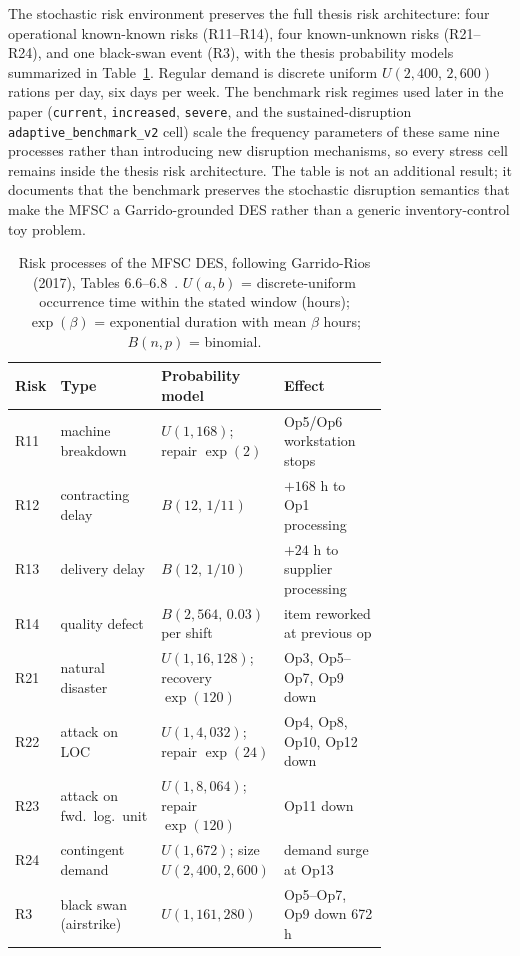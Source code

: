 The stochastic risk environment preserves the full thesis risk
architecture: four operational known-known risks (R11--R14), four
known-unknown risks (R21--R24), and one black-swan event (R3), with the
thesis probability models summarized in
Table~\ref{tab:risk_provenance_examples}. Regular demand is discrete
uniform $U(2{,}400,\,2{,}600)$ rations per day, six days per week. The
benchmark risk regimes used later in the paper (\texttt{current},
\texttt{increased}, \texttt{severe}, and the sustained-disruption
\texttt{adaptive\_benchmark\_v2} cell) scale the frequency parameters
of these same nine processes rather than introducing new disruption
mechanisms, so every stress cell remains inside the thesis risk
architecture. The table is not an additional result; it documents that
the benchmark preserves the stochastic disruption semantics that make
the MFSC a Garrido-grounded DES rather than a generic
inventory-control toy problem.

\begin{table}[htbp]
\centering
\caption{Risk processes of the MFSC DES, following Garrido-Rios (2017),
Tables 6.6--6.8~\cite{garrido2017}. $U(a,b)$ = discrete-uniform
occurrence time within the stated window (hours); $\exp(\beta)$ =
exponential duration with mean $\beta$ hours; $B(n,p)$ = binomial.}
\label{tab:risk_provenance_examples}
\small
\begin{tabular}{l p{0.17\linewidth} p{0.27\linewidth} p{0.30\linewidth}}
\toprule
Risk & Type & Probability model & Effect \\
\midrule
R11 & machine breakdown & $U(1,168)$; repair $\exp(2)$ & Op5/Op6 workstation stops \\
R12 & contracting delay & $B(12,\,1/11)$ & $+168$ h to Op1 processing \\
R13 & delivery delay & $B(12,\,1/10)$ & $+24$ h to supplier processing \\
R14 & quality defect & $B(2{,}564,\,0.03)$ per shift & item reworked at previous op \\
R21 & natural disaster & $U(1,16{,}128)$; recovery $\exp(120)$ & Op3, Op5--Op7, Op9 down \\
R22 & attack on LOC & $U(1,4{,}032)$; repair $\exp(24)$ & Op4, Op8, Op10, Op12 down \\
R23 & attack on fwd.\ log.\ unit & $U(1,8{,}064)$; repair $\exp(120)$ & Op11 down \\
R24 & contingent demand & $U(1,672)$; size $U(2{,}400,2{,}600)$ & demand surge at Op13 \\
R3 & black swan (airstrike) & $U(1,161{,}280)$ & Op5--Op7, Op9 down 672 h \\
\bottomrule
\end{tabular}
\end{table}

